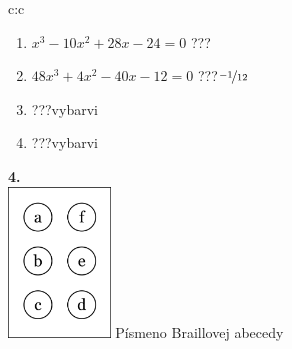 \documentclass[10pt]{report}
\begin{document}
\begin{tabular}{c:c}
\begin{minipage}[c][99mm][t]{0.49\linewidth}
\begin{center}
\begin{minipage}{0.77\linewidth}
\begin{center}
\begin{varwidth}{\textwidth}
\begin{enumerate}
\item $x^3-10x^2+28x-24=0$\quad \dotfill\; ???\;\dotfill {}
\item $48x^3+4x^2-40x-12=0$\quad \dotfill\; ???\;\dotfill \quad $\nicefrac{-1}{12}$
\item \quad \dotfill\; ???\;\dotfill \quad vybarvi
\item \quad \dotfill\; ???\;\dotfill \quad vybarvi
\end{enumerate}
\end{varwidth}
\end{center}
\end{minipage}
\begin{minipage}{0.20\linewidth}
\begin{center}
{\Huge\bfseries 4.} \\[2mm]
\includegraphics[height=40mm]{../images/braille.png}
{\small Písmeno Braillovej abecedy}
\end{center}
\end{minipage}
\end{center}
\end{minipage}

\end{tabular}
\clearpage
\thispagestyle{empty}
\end{document}
